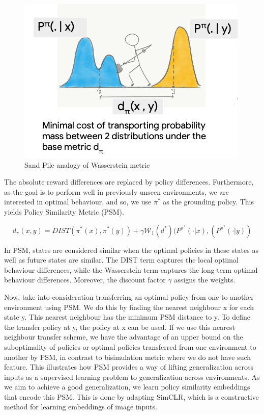 \documentclass{usiinftr}
\begin{document}
\begin{figure}[h]
    \centering
    \includegraphics[width = 0.5\linewidth]{figures/image6.png}
    \caption{Sand Pile analogy of Wasserstein metric \cite{github_contrastive_similarity}}
    \label{fig:SandPile}
\end{figure}

The absolute reward differences are replaced by policy differences. Furthermore, as the goal is to perform well in previously unseen environments, we are interested in optimal behaviour, and so, we use $\pi^*$ as the grounding policy. This yields Policy Similarity Metric (PSM).

\begin{equation}
    d_{\pi}(x,y) = DIST(\pi^*(x), \pi^*(y)) + \gamma \mathcal{W}_1(d^*) (P^{\pi^*}(\cdot | x), (P^{\pi^*}(\cdot | y)) 
\end{equation}
\cite{castro2020scalable}


In PSM, states are considered similar when the optimal policies in these states as well as future states are similar. The DIST term captures the local optimal behaviour differences, while the Wasserstein term captures the long-term optimal behaviour differences. Moreover, the discount factor $\gamma$ assigns the weights. \cite{castro2020scalable}

Now, take into consideration transferring an optimal policy from one to another environment using PSM. We do this by finding the nearest neighbour x for each state y. This nearest neighbour has the minimum PSM distance to y. To define the transfer policy at y, the policy at x can be used. If we use this nearest neighbour transfer scheme, we have the advantage of an upper bound on the suboptimality of policies or optimal policies transferred from one environment to another by PSM, in contrast to bisimulation metric where we do not have such feature. 
\cite{castro2020scalable}
This illustrates how PSM provides a way of lifting generalization across inputs as a supervised learning problem to generalization across environments. As we aim to achieve a good generalization, we learn policy similarity embeddings that encode this PSM. This is done by adapting SimCLR, which is a constructive method for learning embeddings of image inputs.
\end{document}
